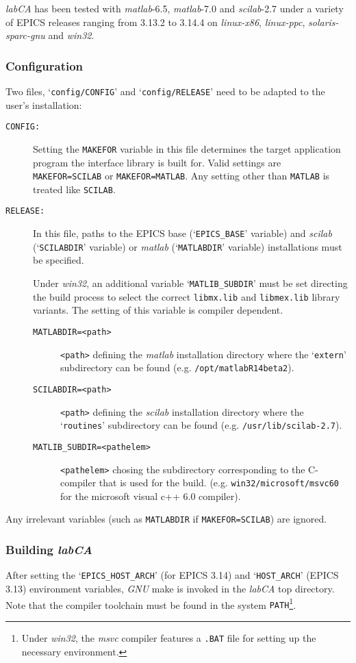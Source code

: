 \documentclass{article}
\newcommand{\sca}{\ita{labCA}}
\newcommand{\scilab}{\ita{scilab}}
\newcommand{\matlab}{\ita{matlab}}
\newcommand{\windoze}{\ita{win32}}
\newcommand{\com}[1]{{\tt #1}}
\newcommand{\ita}[1]{\emph{#1}}
\begin{document}
\sca{} has been tested with \matlab-6.5, \matlab-7.0 and \scilab-2.7
under a variety of EPICS releases ranging from 3.13.2
to 3.14.4 on \ita{linux-x86}, \ita{linux-ppc}, \ita{solaris-sparc-gnu}
and \windoze.

\subsubsection{Configuration}
Two files, `\com{config/CONFIG}' and `\com{config/RELEASE}' need to
be adapted to the user's installation:
\begin{description}
\item[\tt CONFIG:] Setting the \com{MAKEFOR} variable in this file
determines the target application program the interface library is
built for. Valid settings are \com{MAKEFOR=SCILAB} or \com{MAKEFOR=MATLAB}.
Any setting other than \com{MATLAB} is treated like \com{SCILAB}.
%
%
\item[\tt RELEASE:] In this file, paths to the EPICS base (`\com{EPICS\_BASE}'
variable) and \scilab{} (`\com{SCILABDIR}' variable) or \matlab{} (`\com{MATLABDIR}'
variable) installations must be specified.

Under \windoze{}, an additional variable
`\com{MATLIB\_SUBDIR}' must be set directing the build process to select the correct
\com{libmx.lib} and \com{libmex.lib} library variants. The setting of this variable
is compiler dependent.
\begin{description}
\item[\tt MATLABDIR=<path>] \com{<path>} defining the \matlab{} installation
directory where the `\com{extern}' subdirectory can be found (e.g.
\com{/opt/matlabR14beta2}).
\item[\tt SCILABDIR=<path>] \com{<path>} defining the \scilab{} installation
directory where the `\com{routines}' subdirectory can be found (e.g.
\com{/usr/lib/scilab-2.7}).
\item[\tt MATLIB\_SUBDIR=<pathelem>] \com{<pathelem>} chosing the subdirectory
corresponding to the C-compiler that is used for the build. (e.g. 
\com{win32/microsoft/msvc60} for the microsoft visual c++ 6.0 compiler).
\end{description}
\end{description}
Any irrelevant variables (such as \com{MATLABDIR} if \com{MAKEFOR=SCILAB})
are ignored.

\subsubsection{Building \sca}
After setting the
`\com{EPICS\_HOST\_ARCH}' (for EPICS 3.14) and `\com{HOST\_ARCH}' (EPICS 3.13)
environment variables, \ita{GNU} make is invoked in the \sca{} top 
directory. Note that the compiler toolchain must be found in the system
\com{PATH}\footnote{
Under \windoze, the \ita{msvc} compiler features a \com{.BAT} file for
setting up the necessary environment.
}.
\end{document}
